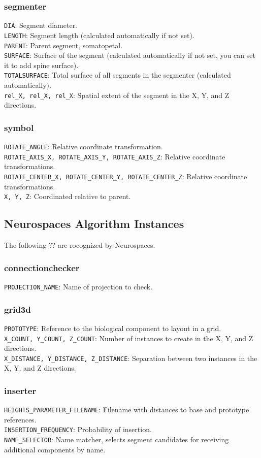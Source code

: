 \documentclass[12pt]{article}
\begin{document}
\subsubsection{segmenter}
{\tt DIA}: Segment diameter.\\
{\tt LENGTH}: Segment length (calculated automatically if not set).\\
{\tt PARENT}: Parent segment, somatopetal.\\
{\tt SURFACE}: Surface of the segment (calculated automatically if not set, you can set it to add spine surface).\\
{\tt TOTALSURFACE}: Total surface of all segments in the segmenter (calculated automatically).\\
{\tt rel\_X, rel\_X, rel\_X}: Spatial extent of the segment in the X, Y, and Z directions.
\subsubsection{symbol}
{\tt ROTATE\_ANGLE}: Relative coordinate transformation.\\
{\tt ROTATE\_AXIS\_X, ROTATE\_AXIS\_Y, ROTATE\_AXIS\_Z}: Relative coordinate transformations.\\
{\tt ROTATE\_CENTER\_X, ROTATE\_CENTER\_Y, ROTATE\_CENTER\_Z}: Relative coordinate transformations.\\
{\tt X, Y, Z}: Coordinated relative to parent.

\subsection{Neurospaces Algorithm Instances}
The following ?? are rocognized by Neurospaces.
\subsubsection{connectionchecker}
{\tt PROJECTION\_NAME}: Name of projection to check.
\subsubsection{grid3d}
{\tt PROTOTYPE}: Reference to the biological component to layout in a grid.\\
{\tt X\_COUNT, Y\_COUNT, Z\_COUNT}: Number of instances to create in the X, Y, and Z directions.\\
{\tt X\_DISTANCE, Y\_DISTANCE, Z\_DISTANCE}: Separation between two instances in the X, Y, and Z directions.
\subsubsection{inserter}
{\tt HEIGHTS\_PARAMETER\_FILENAME}: Filename with distances to base and prototype references.\\
{\tt INSERTION\_FREQUENCY}: Probability of insertion.\\
{\tt NAME\_SELECTOR}: Name matcher, selects segment candidates for receiving additional components by name.
\end{document}
